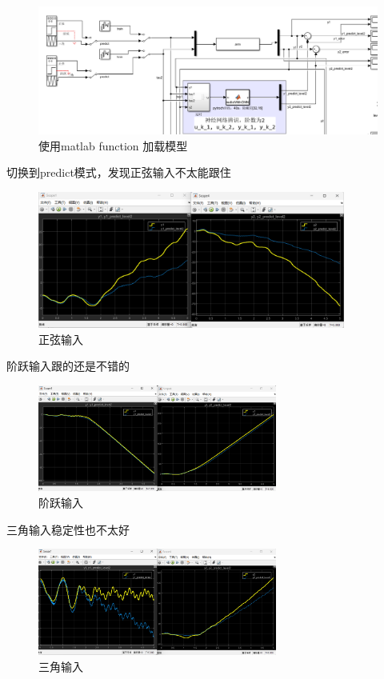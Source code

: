 \documentclass[12pt,a4paper,UTF8]{article}
\begin{document}
\begin{figure}[htbp] \centering \includegraphics[width=\textwidth]{figures/2024-12-23-23-20-29.png} \caption{使用matlab function 加载模型} \label{  }\end{figure}

切换到predict模式，发现正弦输入不太能跟住

\begin{figure}[htbp] 
\centering 
\includegraphics[width=0.9\textwidth]{figures/2024-12-23-23-13-26.png} \caption{正弦输入} \label{  }\end{figure}


阶跃输入跟的还是不错的

\begin{figure}[htbp] \centering \includegraphics[width=0.7\textwidth]{figures/2024-12-23-23-14-27.png} \caption{阶跃输入} \label{  }\end{figure}

三角输入稳定性也不太好
\begin{figure}[htbp] \centering \includegraphics[width=0.7\textwidth]{figures/2024-12-23-23-15-31.png} \caption{三角输入} \label{  }\end{figure}
\end{document}
